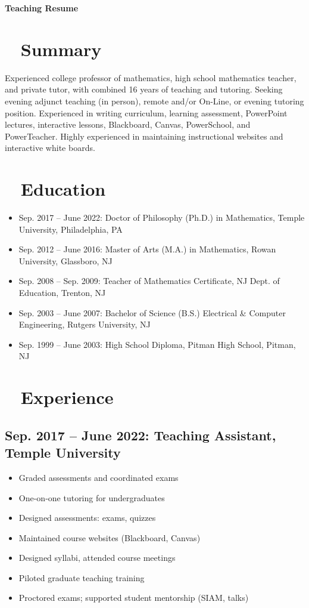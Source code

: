 \documentclass[10pt]{article}
\begin{document}
\begin{center}
    {\huge\bfseries Teaching Resume} \\[0.5ex]
\end{center}

\section*{\faUser ~ Summary}
Experienced college professor of mathematics, high school mathematics teacher, and private tutor, with combined 16 years of teaching and tutoring. Seeking evening adjunct teaching (in person), remote and/or On-Line, or evening tutoring position. Experienced in writing curriculum, learning assessment, PowerPoint lectures, interactive lessons, Blackboard, Canvas, PowerSchool, and PowerTeacher. Highly experienced in maintaining instructional websites and interactive white boards.

\section*{\faGraduationCap ~ Education}
\begin{itemize}
    \item Sep. 2017 -- June 2022: Doctor of Philosophy (Ph.D.) in Mathematics, Temple University, Philadelphia, PA
    \item Sep. 2012 -- June 2016: Master of Arts (M.A.) in Mathematics, Rowan University, Glassboro, NJ
    \item Sep. 2008 -- Sep. 2009: Teacher of Mathematics Certificate, NJ Dept. of Education, Trenton, NJ
    \item Sep. 2003 -- June 2007: Bachelor of Science (B.S.) Electrical \& Computer Engineering, Rutgers University, NJ
    \item Sep. 1999 -- June 2003: High School Diploma, Pitman High School, Pitman, NJ
\end{itemize}

\section*{\faChalkboardTeacher ~ Experience}
\subsection*{Sep. 2017 -- June 2022: Teaching Assistant, Temple University}
\begin{itemize}
    \item Graded assessments and coordinated exams
    \item One-on-one tutoring for undergraduates
    \item Designed assessments: exams, quizzes
    \item Maintained course websites (Blackboard, Canvas)
    \item Designed syllabi, attended course meetings
    \item Piloted graduate teaching training
    \item Proctored exams; supported student mentorship (SIAM, talks)
\end{itemize}
\end{document}
